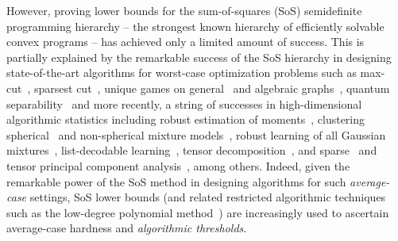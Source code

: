 \documentclass[10pt,a4paper]{article}
\theoremstyle{definition}
\begin{document}
However, proving lower bounds for the sum-of-squares (SoS) semidefinite programming hierarchy -- the strongest known hierarchy of efficiently solvable convex programs -- has achieved only a limited amount of success.  This is partially explained by the remarkable success of the SoS hierarchy in designing state-of-the-art algorithms for worst-case optimization problems such as max-cut~\cite{MR1412228-Goemans95}, sparsest cut~\cite{MR2535878-Arora09}, unique games on general~\cite{MR3424199-Arora15} and algebraic graphs~\cite{DBLP:journals/corr/abs-2006-09969,DBLP:journals/corr/abs-2011-04658},  quantum separability~\cite{DBLP:conf/stoc/BarakKS17} and more recently, a string of successes in high-dimensional algorithmic statistics including robust estimation of moments~\cite{DBLP:journals/corr/abs-1711-11581}, clustering spherical~\cite{HopkinsLi17,KothariSteinhardt17} and non-spherical mixture models~\cite{bakshi2020outlierrobust, DHKK20}, robust learning of all Gaussian mixtures~\cite{DBLP:journals/corr/abs-2012-02119, DBLP:journals/corr/abs-2011-03622}, list-decodable learning~\cite{DBLP:journals/corr/abs-1905-05679,DBLP:journals/corr/abs-1905-04660,DBLP:journals/corr/abs-2002-05139,raghavendra2020list}, tensor decomposition~\cite{DBLP:conf/focs/MaSS16}, and sparse~\cite{DBLP:conf/focs/dOrsiKNS20} and tensor principal component analysis~\cite{DBLP:conf/colt/HopkinsSS15}, among others. Indeed, given the remarkable power of the SoS method in designing algorithms for such \emph{average-case} settings, SoS lower bounds (and related restricted algorithmic techniques such as the low-degree polynomial method~\cite{8104104,DBLP:conf/focs/HopkinsS17,DBLP:journals/corr/abs-1907-11636}) are increasingly used to ascertain average-case hardness and \emph{algorithmic thresholds}. 
\end{document}
